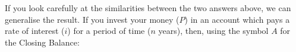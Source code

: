         \label{m39332*id69952}If you look carefully at the similarities between the two answers above, we can generalise the result. If you invest your money (\begin{math}P\end{math}) in an account which pays a rate of interest (\begin{math}i\end{math}) for a period of time (\begin{math}n\end{math} years), then, using the symbol \begin{math}A\end{math} for the Closing Balance:\par 
        \label{m39332*uid34}\nopagebreak\noindent{}
    
